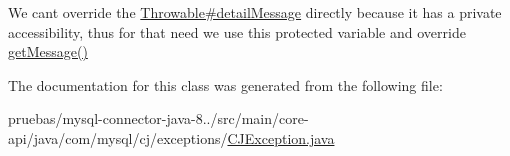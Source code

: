 We can\textquotesingle{}t override the \mbox{\hyperlink{}{Throwable\#detail\+Message}} directly because it has a private accessibility, thus for that need we use this protected variable and override \mbox{\hyperlink{classcom_1_1mysql_1_1cj_1_1exceptions_1_1_c_j_exception_a9918a82c000e0061033895fbc12126be}{get\+Message()}} 

The documentation for this class was generated from the following file\+:\begin{DoxyCompactItemize}
\item 
pruebas/mysql-\/connector-\/java-\/8../src/main/core-\/api/java/com/mysql/cj/exceptions/\mbox{\hyperlink{_c_j_exception_8java}{C\+J\+Exception.\+java}}\end{DoxyCompactItemize}
